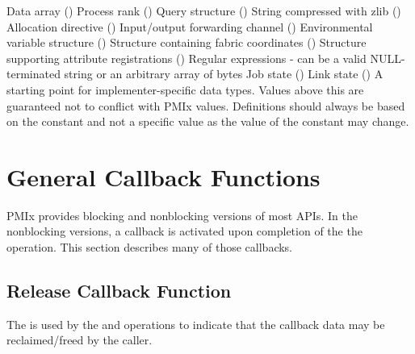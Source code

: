 \begin{constantdesc}
%
Data array ()
%
Process rank ()
%
Query structure ()
%
String compressed with zlib ()
%
Allocation directive ()
%
Input/output forwarding channel ()
%
Environmental variable structure ()
%
Structure containing fabric coordinates ()
%
Structure supporting attribute registrations ()
%
Regular expressions - can be a valid NULL-terminated string or an arbitrary array of bytes
%
Job state ()
%
Link state ()
%
A starting point for implementer-specific data types.
Values above this are guaranteed not to conflict with \ac{PMIx} values.
Definitions should always be based on the  constant and not a specific value as the value of the constant may change.
%

\end{constantdesc}

\section{General Callback Functions}

PMIx provides blocking and nonblocking versions of most APIs.
In the nonblocking versions, a callback is activated upon completion of the the operation.
This section describes many of those callbacks.


\subsection{Release Callback Function}

\summary

The  is used by the  and  operations to indicate that the callback data may be reclaimed/freed by the caller.

